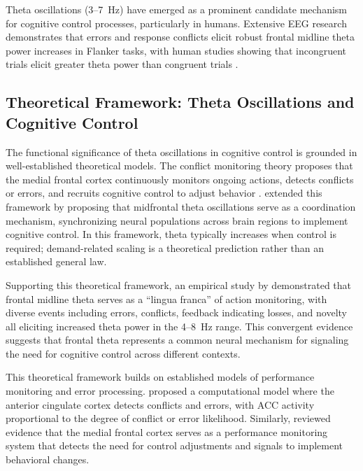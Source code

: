 \documentclass[11pt]{article}
\begin{document}
Theta oscillations (3--7~Hz) have emerged as a prominent candidate mechanism for cognitive control processes, particularly in humans. Extensive EEG research demonstrates that errors and response conflicts elicit robust frontal midline theta power increases in Flanker tasks, with human studies showing that incongruent trials elicit greater theta power than congruent trials \citep{linton2024behavioral}.

\subsection{Theoretical Framework: Theta Oscillations and Cognitive Control}

The functional significance of theta oscillations in cognitive control is grounded in well-established theoretical models. The conflict monitoring theory proposes that the medial frontal cortex continuously monitors ongoing actions, detects conflicts or errors, and recruits cognitive control to adjust behavior \citep{botvinick2001conflict, yeung2004neural}. \citet{cavanagh2014frontal} extended this framework by proposing that midfrontal theta oscillations serve as a coordination mechanism, synchronizing neural populations across brain regions to implement cognitive control. In this framework, theta typically increases when control is required; demand-related scaling is a theoretical prediction rather than an established general law.

Supporting this theoretical framework, an empirical study by \citet{cavanagh2012theta} demonstrated that frontal midline theta serves as a ``lingua franca'' of action monitoring, with diverse events including errors, conflicts, feedback indicating losses, and novelty all eliciting increased theta power in the 4--8~Hz range. This convergent evidence suggests that frontal theta represents a common neural mechanism for signaling the need for cognitive control across different contexts.

This theoretical framework builds on established models of performance monitoring and error processing. \citet{yeung2004neural} proposed a computational model where the anterior cingulate cortex detects conflicts and errors, with ACC activity proportional to the degree of conflict or error likelihood. Similarly, \citet{ridderinkhof2004role} reviewed evidence that the medial frontal cortex serves as a performance monitoring system that detects the need for control adjustments and signals to implement behavioral changes.
\end{document}
